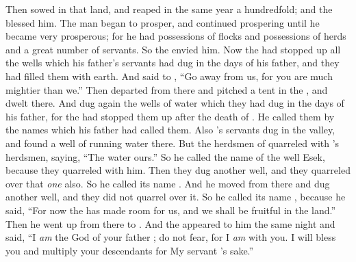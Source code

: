 

\bverse Then \Isaac sowed in that land, and reaped in the same year a hundredfold; and the \lord blessed him.
\bverse The man began to prosper, and continued prospering until he became very prosperous;
\bverse for he had possessions of flocks and possessions of herds and a great number of servants. So the  envied him.
\bverse Now the  had stopped up all the wells which his father's servants had dug in the days of \Abraham his father, and they had filled them with earth.
\bverse And \Abimelech said to \Isaac, ``Go away from us, for you are much mightier than we.''
\bverse Then \Isaac departed from there and pitched a tent in the , and dwelt there.
\bverse And \Isaac dug again the wells of water which they had dug in the days of \Abraham his father, for the  had stopped them up after the death of \Abraham. He called them by the names which his father had called them.
\bverse Also \Isaac's servants dug in the valley, and found a well of running water there.
\bverse But the herdsmen of  quarreled with \Isaac's herdsmen, saying, ``The water \is ours.'' So he called the name of the well Esek, because they quarreled with him.
\bverse Then they dug another well, and they quarreled over that \textit{one} also. So he called its name .
\bverse And he moved from there and dug another well, and they did not quarrel over it. So he called its name , because he said, ``For now the \lord has made room for us, and we shall be fruitful in the land.''
\bverse Then he went up from there to \Beersheba.
\bverse And the \lord appeared to him the same night and said, ``I \textit{am} the God of your father \Abraham; do not fear, for I \textit{am} with you. I will bless you and multiply your descendants for My servant \Abraham's sake.''
